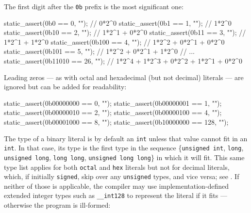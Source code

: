 \noindent The first digit after the \lstinline!0b! prefix is the most significant
one:

\begin{emcppslisting}[emcppsbatch=e1]
static_assert(0b0     ==  0, "");  // 0*2^0
static_assert(0b1     ==  1, "");  // 1*2^0
static_assert(0b10    ==  2, "");  // 1*2^1 + 0*2^0
static_assert(0b11    ==  3, "");  // 1*2^1 + 1*2^0
static_assert(0b100   ==  4, "");  // 1*2^2 + 0*2^1 + 0*2^0
static_assert(0b101   ==  5, "");  // 1*2^2 + 0*2^1 + 1*2^0
// ...
static_assert(0b11010 == 26, "");  // 1*2^4 + 1*2^3 + 0*2^2 + 1*2^1 + 0*2^0
\end{emcppslisting}


\noindent Leading zeros --- as with octal and hexadecimal (but not decimal)
literals --- are ignored but can be added for readability:

\begin{emcppslisting}
static_assert(0b00000000 ==   0, "");
static_assert(0b00000001 ==   1, "");
static_assert(0b00000010 ==   2, "");
static_assert(0b00000100 ==   4, "");
static_assert(0b00001000 ==   8, "");
static_assert(0b10000000 == 128, "");
\end{emcppslisting}


\noindent The type of a binary literal
is by
default an \lstinline!int! unless that value cannot fit in an
\lstinline!int!. In that case, its type is the first type in the sequence
\{\lstinline!unsigned!~\lstinline!int!, %
 \lstinline!long!,
 \lstinline!unsigned!~\lstinline!long!, \lstinline!long!~\lstinline!long!,
\lstinline!unsigned!~\lstinline!long!~\lstinline!long!\} in which it will fit. This
same type list applies for both \lstinline!octal! and \lstinline!hex!
literals but not for decimal literals, which, if initially
\lstinline!signed!, skip over any \lstinline!unsigned! types, and vice versa;
see .
  If neither of those is applicable, the compiler may use implementation-defined extended integer types such as \lstinline!__int128! to represent the literal if it fits --- otherwise the program is ill-formed:


